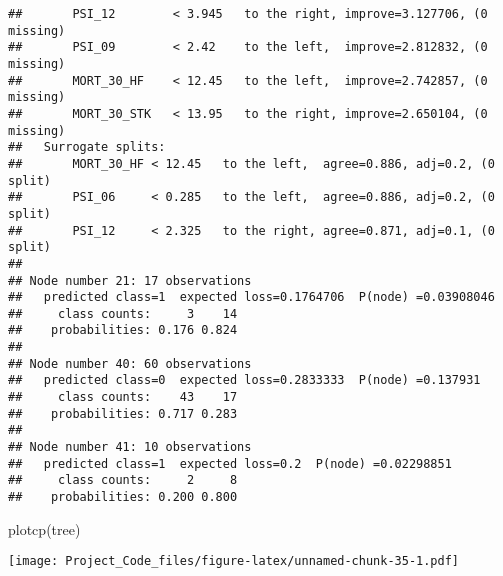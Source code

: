 \documentclass[
]{article}
\newenvironment{Shaded}{\begin{snugshade}}{\end{snugshade}}
\newcommand{\AttributeTok}[1]{\textcolor[rgb]{0.77,0.63,0.00}{#1}}
\newcommand{\CommentTok}[1]{\textcolor[rgb]{0.56,0.35,0.01}{\textit{#1}}}
\newcommand{\FunctionTok}[1]{\textcolor[rgb]{0.00,0.00,0.00}{#1}}
\newcommand{\NormalTok}[1]{#1}
\newcommand{\OtherTok}[1]{\textcolor[rgb]{0.56,0.35,0.01}{#1}}
\newcommand{\SpecialCharTok}[1]{\textcolor[rgb]{0.00,0.00,0.00}{#1}}
\newcommand{\StringTok}[1]{\textcolor[rgb]{0.31,0.60,0.02}{#1}}
\begin{document}
\begin{verbatim}
##       PSI_12        < 3.945   to the right, improve=3.127706, (0 missing)
##       PSI_09        < 2.42    to the left,  improve=2.812832, (0 missing)
##       MORT_30_HF    < 12.45   to the left,  improve=2.742857, (0 missing)
##       MORT_30_STK   < 13.95   to the right, improve=2.650104, (0 missing)
##   Surrogate splits:
##       MORT_30_HF < 12.45   to the left,  agree=0.886, adj=0.2, (0 split)
##       PSI_06     < 0.285   to the left,  agree=0.886, adj=0.2, (0 split)
##       PSI_12     < 2.325   to the right, agree=0.871, adj=0.1, (0 split)
## 
## Node number 21: 17 observations
##   predicted class=1  expected loss=0.1764706  P(node) =0.03908046
##     class counts:     3    14
##    probabilities: 0.176 0.824 
## 
## Node number 40: 60 observations
##   predicted class=0  expected loss=0.2833333  P(node) =0.137931
##     class counts:    43    17
##    probabilities: 0.717 0.283 
## 
## Node number 41: 10 observations
##   predicted class=1  expected loss=0.2  P(node) =0.02298851
##     class counts:     2     8
##    probabilities: 0.200 0.800
\end{verbatim}

\begin{Shaded}
\begin{Highlighting}[]
\FunctionTok{plotcp}\NormalTok{(tree)}
\end{Highlighting}
\end{Shaded}

\texttt{[image: Project\_Code\_files/figure-latex/unnamed-chunk-35-1.pdf]}

\begin{Shaded}
\end{Shaded}
\end{document}
